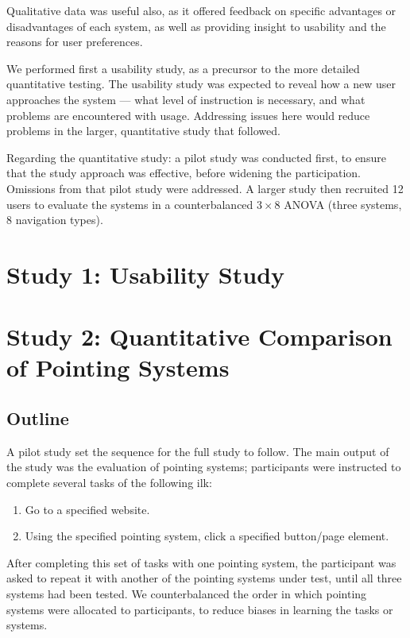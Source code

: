 \documentclass[a4paper, 12pt]{report}
\begin{document}
Qualitative data was useful also, as it offered feedback on specific advantages or disadvantages of each system, as well as providing insight to usability and the reasons for user preferences.

We performed first a usability study, as a precursor to the more detailed quantitative testing. The usability study was expected to reveal how a new user approaches the system --- what level of instruction is necessary, and what problems are encountered with usage. Addressing issues here would reduce problems in the larger, quantitative study that followed.

Regarding the quantitative study: a pilot study was conducted first, to ensure that the study approach was effective, before widening the participation. Omissions from that pilot study were addressed.
A larger study then recruited 12 users to evaluate the systems in a counterbalanced $3 \times 8$ ANOVA (three systems, 8 navigation types).

\section{Study 1: Usability Study}
\section{Study 2: Quantitative Comparison of Pointing Systems}
\subsection{Outline}
A pilot study set the sequence for the full study to follow. The main output of the study was the evaluation of pointing systems; participants were instructed to complete several tasks of the following ilk:
\begin{enumerate}
\item Go to a specified website.
\item Using the specified pointing system, click a specified button/page element.
\end{enumerate}
After completing this set of tasks with one pointing system, the participant was asked to repeat it with another of the pointing systems under test, until all three systems had been tested. We counterbalanced the order in which pointing systems were allocated to participants, to reduce biases in learning the tasks or systems.
\end{document}
